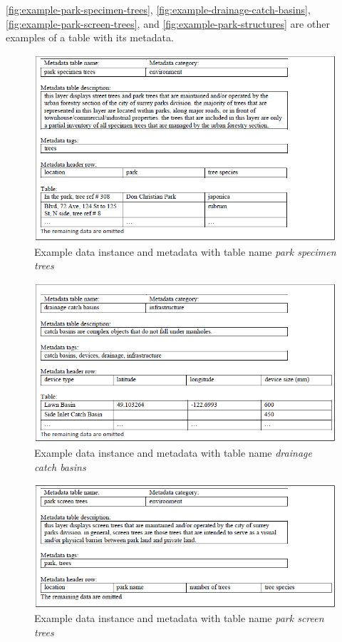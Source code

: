 \autoref{fig:example-park-specimen-trees}, \autoref{fig:example-drainage-catch-basins}, \autoref{fig:example-park-screen-trees}, and \autoref{fig:example-park-structures} are other examples of a table with its metadata.

\begin{figure}
    \centering
    \includegraphics[width=5in]{figures/example-park-specimen-trees.png}
    \caption{Example data instance and metadata with table name \textit{park specimen trees}}
    \label{fig:example-park-specimen-trees}
\end{figure}

\begin{figure}
    \centering
    \includegraphics[width=5in]{figures/example-drainage-catch-basins.png}
    \caption{Example data instance and metadata with table name \textit{drainage catch basins}}
    \label{fig:example-drainage-catch-basins}
\end{figure}

\begin{figure}
    \centering
    \includegraphics[width=5in]{figures/example-park-screen-trees.png}
    \caption{Example data instance and metadata with table name \textit{park screen trees}}
    \label{fig:example-park-screen-trees}
\end{figure}

